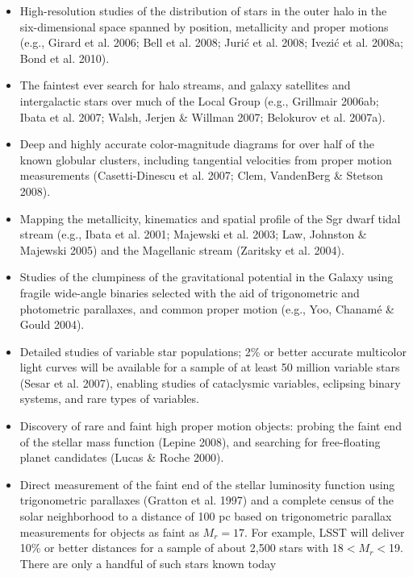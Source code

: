 \documentclass{emulateapj}
\begin{document}
\begin{itemize} 
\item High-resolution studies of the distribution of stars in the outer halo
      in the six-dimensional space spanned by position, metallicity and proper
      motions (e.g., Girard et al. 2006; Bell et al. 2008; Juri\'{c} et al. 2008;
      Ivezi\'{c} et al. 2008a; Bond et al. 2010).
\item The faintest ever search for halo streams, and galaxy satellites and intergalactic stars 
      over much of the Local Group (e.g., Grillmair 2006ab; Ibata et al. 2007; Walsh, 
      Jerjen \& Willman 2007; Belokurov et al. 2007a).
\item Deep and highly accurate color-magnitude diagrams for over half of the known 
      globular clusters, including tangential velocities from proper motion 
      measurements (Casetti-Dinescu et al. 2007; Clem, VandenBerg \& Stetson 2008). 
\item Mapping the metallicity, kinematics and spatial profile of the Sgr dwarf tidal 
      stream (e.g., Ibata et al. 2001; Majewski et al. 2003; Law, Johnston \& Majewski 2005)
       and the Magellanic stream (Zaritsky et al. 2004). 
\item Studies of the clumpiness of the gravitational potential in the Galaxy using 
      fragile wide-angle binaries selected with the aid of trigonometric and 
      photometric parallaxes, and common proper motion (e.g., Yoo, Chanam\'{e} \& Gould 2004).
\item Detailed studies of variable star populations; 2\% or better accurate 
      multicolor light curves will be available for a sample of at least 50 
      million variable stars (Sesar et al. 2007), enabling studies of
      cataclysmic variables, eclipsing binary systems, and rare types of variables.
\item Discovery of rare and faint high proper motion objects: probing the
      faint end of the stellar mass function (Lepine 2008), and searching for 
      free-floating planet candidates (Lucas \& Roche 2000).
\item Direct measurement of the faint end of the stellar luminosity function 
      using trigonometric parallaxes (Gratton et al. 1997) and a complete census of the 
      solar neighborhood to a distance of 100 pc based on trigonometric parallax measurements 
      for objects as faint as $M_r=17$. For example, LSST will deliver 10\% or
      better distances for a sample of about 2,500 stars with
      18$<M_r<$19. There are only a handful of such stars known today 

\end{itemize}
\end{document}
